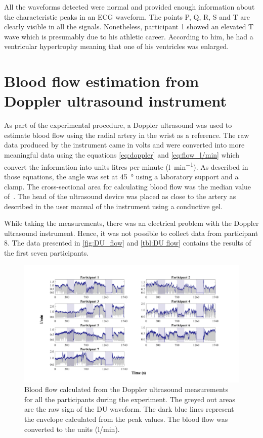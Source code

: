 All the waveforms detected were normal and provided enough information about the characteristic peaks in an ECG waveform. The points P, Q, R, S and T are clearly visible in all the signals. Nonetheless, participant 1 showed an elevated T wave which is presumably due to his athletic career. According to him, he had a ventricular hypertrophy meaning that one of his ventricles was enlarged.  

\section{Blood flow estimation from Doppler ultrasound instrument}
\label{section comparison 1}
As part of the experimental procedure, a Doppler ultrasound was used to estimate blood flow using the radial artery in the wrist as a reference. The raw data produced by the instrument came in volts and were converted into more meaningful data using the equations \ref {eq:doppler} and \ref {eq:flow_l/min} which convert the information into units litres per minute (\si{\litre\per\minute}). As described in those equations, the angle was set at \SI{45}{\degree} using a laboratory support and a clamp. The cross-sectional area for calculating blood flow was the median value of~\cite {ashraf2010size}. The head of the ultrasound device was placed as close to the artery as described in the user manual of the instrument using a conductive gel.

While taking the measurements, there was an electrical problem with the Doppler ultrasound instrument. Hence, it was not possible to collect data from participant 8. The data presented in \ref{fig:DU_flow} and \ref{tbl:DU flow} contains the results of the first seven participants.

\begin{figure}[!htb]
	\includegraphics[width=\textwidth,height=\textheight,keepaspectratio,trim={2.5cm 0cm 2.5cm 0 cm},clip]{figure16}    
	\caption[Blood flow calculated from Doppler ultrasond device all along the whole expetiment]{Blood flow calculated from the Doppler ultrasound measurements for all the participants during the experiment. The greyed out areas are the raw sign of the DU waveform. The dark blue lines represent the envelope calculated from the peak values. The blood flow was converted to the units (\si[per-mode=symbol]{\litre\per\minute}).}
	\label{fig:DU flow}
\end{figure}

